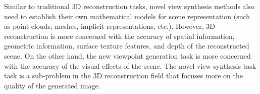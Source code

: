 Similar to traditional 3D reconstruction tasks, novel view synthesis methods also need to establish their own mathematical models for scene representation (such as point clouds, meshes, implicit representations, etc.). However, 3D reconstruction is more concerned with the accuracy of spatial information, geometric information, surface texture features, and depth of the reconstructed scene. On the other hand, the new viewpoint generation task is more concerned with the accuracy of the visual effects of the scene. The novel view synthesis task task is a sub-problem in the 3D reconstruction field that focuses more on the quality of the generated image.
